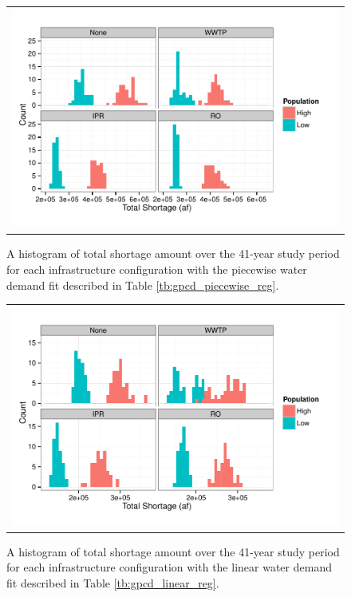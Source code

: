 \documentclass[opre,nonblindrev]{informs3} %
\begin{document}
\begin{figure}
	\FIGURE
	{%
		\begin{tabular}{c}
			\includegraphics*[width=.9\textwidth]{images/piecewise_shortage_frequency}%
		\end{tabular}
	}
	{
		A histogram of total shortage amount over the 41-year study period for each infrastructure configuration with the piecewise water demand fit described in Table \ref{tb:gpcd_piecewise_reg}.
		\label{fig:shortage_frequency_piecewise}
	}
	{}
\end{figure}

\begin{figure}
	\FIGURE
	{%
		\begin{tabular}{c}
			\includegraphics*[width=.9\textwidth]{images/linear_shortage_frequency}%
		\end{tabular}
	}
	{
		A histogram of total shortage amount over the 41-year study period for each infrastructure configuration with the linear water demand fit described in Table \ref{tb:gpcd_linear_reg}.
		\label{fig:shortage_frequency_linear}
	}
	{}
\end{figure}
\end{document}

